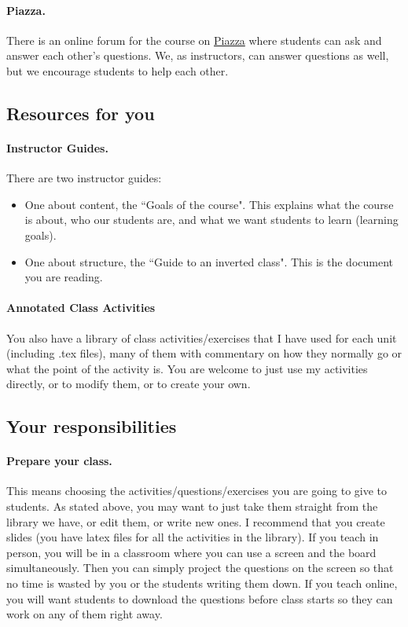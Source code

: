 \documentclass[11pt]{article}
\begin{document}
		\paragraph{Piazza.} There is an online forum for the course on \href{https://piazza.com/}{Piazza} where students can ask and answer each other's questions. We, as instructors, can answer questions as well, but we encourage students to help each other.

\subsection{Resources for you}

	\paragraph{Instructor Guides.} There are two instructor guides:
			\begin{itemize}
				\item One about content, the ``Goals of the course".   This explains what the course is about, who our students are, and what we want students to learn (learning goals).
				\item One about structure, the ``Guide to an inverted class".  This is the document you are reading.
			\end{itemize}

	\paragraph{Annotated Class Activities} You also have a library of class activities/exercises that I have used for each unit (including .tex files), many of them with commentary on how they normally go or what the point of the activity is.  You are welcome to just use my activities directly, or to modify them, or to create your own.


\newpage

\subsection{Your responsibilities}\label{responsibilities}

		\paragraph{Prepare your class.}  This means choosing the activities/questions/exercises you are going to give to students.  As stated above, you may want to just take them straight from the library we have, or edit them, or write new ones.    I recommend that you create slides (you have latex files for all the activities in the library).    If you teach in person, you will be in a classroom where you can use a screen and the board simultaneously.  Then you can simply project the questions on the screen so that no time is wasted by you or the students writing them down.  If you teach online, you will want students to download the questions before class starts so they can work on any of them right away.
		
\end{document}
